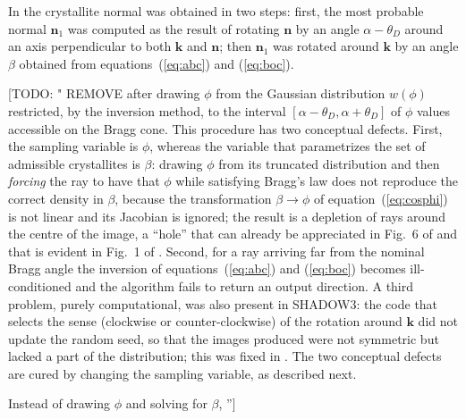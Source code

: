 \documentclass{iucr}
\newcommand{\todo}[1]{{\color{red}[TODO: "#1'']}}
\begin{document}
In \cite{mosaicsSanchezDelRio1992} the crystallite normal was obtained in two
steps: first, the most probable normal $\mathbf{n}_1$ was computed as the result of
rotating $\mathbf{n}$ by an angle $\alpha - \theta_D$ around an axis perpendicular
to both $\mathbf{k}$ and $\mathbf{n}$; then $\mathbf{n}_1$ was rotated around
$\mathbf{k}$ by an angle $\beta$ obtained from equations~(\ref{eq:abc}) and
(\ref{eq:boc}).
\todo{ REMOVE
after drawing $\phi$ from the Gaussian distribution $w(\phi)$ restricted, by the inversion method, to the interval $[\alpha - \theta_D, \alpha + \theta_D]$ of $\phi$ values accessible on the Bragg
cone. This procedure has two conceptual defects. First, the sampling variable is $\phi$, whereas the variable that parametrizes the set of admissible crystallites is $\beta$: drawing $\phi$ from its truncated distribution and then \emph{forcing} the ray to have that $\phi$ while satisfying Bragg's law does not reproduce the correct density in $\beta$, because the transformation $\beta \rightarrow \phi$ of
equation~(\ref{eq:cosphi}) is not linear and its Jacobian is ignored; the result is
a depletion of rays around the centre of the image, a ``hole'' that can already be
appreciated in Fig.~6 of \cite{mosaicsSanchezDelRio1992} and that is evident in
Fig.~1 of \cite{mosaicsSanchezDelRio2013}. Second, for a ray arriving far from the
nominal Bragg angle the inversion of equations~(\ref{eq:abc}) and (\ref{eq:boc})
becomes ill-conditioned and the algorithm fails to return an output direction.
A third problem, purely computational, was also present in SHADOW3: the code that
selects the sense (clockwise or counter-clockwise) of the rotation around
$\mathbf{k}$ did not update the random seed, so that the images produced were not
symmetric but lacked a part of the distribution; this was fixed in
\cite{mosaicsSanchezDelRio2013}. The two conceptual defects are cured by changing
the sampling variable, as described next.

Instead of drawing $\phi$ and solving for $\beta$, }
\end{document}
